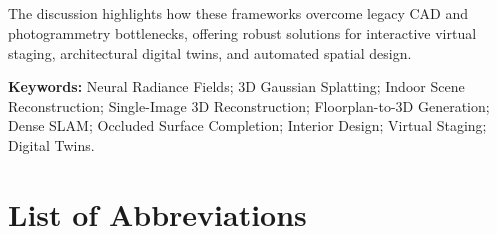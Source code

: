 \documentclass[12pt,a4paper,final]{extreport}
\begin{document}
\paragraph{} The discussion highlights how these frameworks overcome legacy CAD and photogrammetry bottlenecks, offering robust solutions for interactive virtual staging, architectural digital twins, and automated spatial design.

\vspace{0.5cm}
\noindent
\textbf{Keywords:} Neural Radiance Fields; 3D Gaussian Splatting; Indoor Scene Reconstruction; Single-Image 3D Reconstruction; Floorplan-to-3D Generation; Dense SLAM; Occluded Surface Completion; Interior Design; Virtual Staging; Digital Twins.
\endgroup

\newpage

\thispagestyle{plain}
\begingroup
\tableofcontents
\endgroup
\begingroup
\listoffigures
{}
\listoftables
{}
\endgroup

\chapter*{List of Abbreviations}
\end{document}
